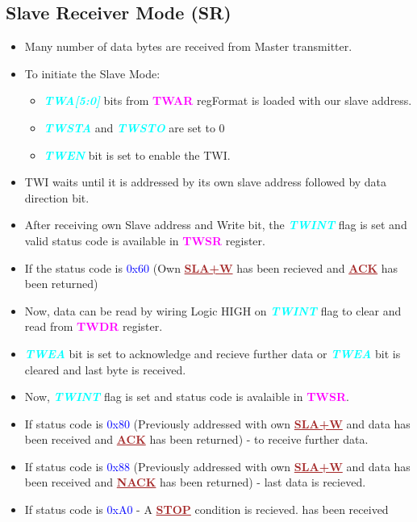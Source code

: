 \documentclass{article}
\newcommand{\bitFormat}[1]{\emph{\textbf{\textcolor{cyan}{#1}}}}
\newcommand{\regFormat}[1]{\textbf{\textcolor{magenta}{#1}}}
\newcommand{\iicFormat}[1]{\textbf{\textcolor{brown}{\underline{#1}}}}
\newcommand{\statusCode}[1]{{\textcolor{blue}{{ \LARGE #1}}}}
\begin{document}
\subsection{Slave Receiver Mode (SR)}
\begin{itemize}
    \item Many number of data bytes are received from Master transmitter.
    \item To initiate the Slave Mode:
    \begin{itemize}
        \item \bitFormat{TWA[5:0]} bits from \regFormat{TWAR} regFormat is loaded with our slave address.
        \item \bitFormat{TWSTA} and \bitFormat{TWSTO} are set to 0
        \item \bitFormat{TWEN} bit is set to enable the TWI.
    \end{itemize}
    \item TWI waits until it is addressed by its own slave address followed by data direction bit.
    \item After receiving own Slave address and Write bit, the \bitFormat{TWINT} flag is set and valid status code is available in \regFormat{TWSR} register.
    \item If the status code is \statusCode{0x60} (Own \iicFormat{SLA+W} has been recieved and \iicFormat{ACK} has been returned)
    \item Now, data can be read by wiring Logic HIGH on \bitFormat{TWINT} flag to clear and read from \regFormat{TWDR} register.
    \item \bitFormat{TWEA} bit is set to acknowledge and recieve further data or \bitFormat{TWEA} bit is cleared and last byte is received.
    \item Now, \bitFormat{TWINT} flag is set and status code is avalaible in \regFormat{TWSR}.
    \item If status code is \statusCode{0x80} (Previously addressed with own \iicFormat{SLA+W} and data has been received and \iicFormat{ACK} has been returned) - to receive further data.
    \item If status code is \statusCode{0x88} (Previously addressed with own \iicFormat{SLA+W} and data has been received and \iicFormat{NACK} has been returned) - last data is recieved.
    \item If status code is \statusCode{0xA0} -  A \iicFormat{STOP} condition is recieved.
    has been received
\end{itemize}
\end{document}
